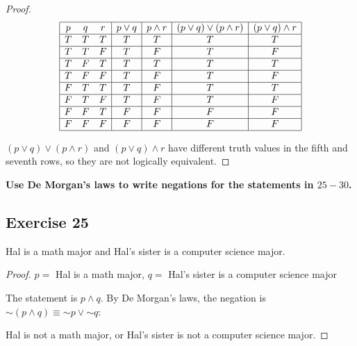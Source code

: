 \documentclass[14pt]{extarticle}
\begin{document}
\begin{proof}
    $$
        \begin{array}{|ccc|c|c|c|c|}
            \hline
            p & q & r & p \vee q & p \wedge r & (p \vee q) \vee (p \wedge r) & (p \vee q) \wedge r \\
            \hline
            T & T & T & T        & T          & T                            & T                   \\
            \hline
            T & T & F & T        & F          & T                            & F                   \\
            \hline
            T & F & T & T        & T          & T                            & T                   \\
            \hline
            T & F & F & T        & F          & T                            & F                   \\
            \hline
            F & T & T & T        & F          & T                            & T                   \\
            \hline
            F & T & F & T        & F          & T                            & F                   \\
            \hline
            F & F & T & F        & F          & F                            & F                   \\
            \hline
            F & F & F & F        & F          & F                            & F                   \\
            \hline
        \end{array}
    $$

    $(p \vee q) \vee (p \wedge r)$ and $(p \vee q) \wedge r$ have different truth values in the fifth and seventh rows, so they are not logically equivalent.
\end{proof}

{\bf Use De Morgan’s laws to write negations for the statements in $25-30$.}

\subsection{Exercise 25}
Hal is a math major and Hal’s sister is a computer science major.

\begin{proof}
    $p =$ Hal is a math major, $q =$ Hal’s sister is a computer science major

    The statement is $p \wedge q$. By De Morgan's laws, the negation is $\sim(p \wedge q) \equiv {\sim p} \vee {\sim q}$:

    Hal is not a math major, or Hal's sister is not a computer science major.
\end{proof}
\end{document}
